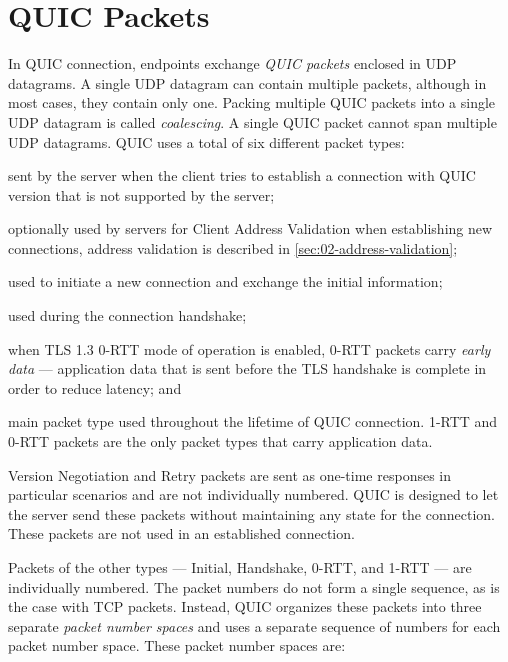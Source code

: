 \section{QUIC Packets}

In QUIC connection, endpoints exchange \textit{QUIC packets} enclosed in UDP datagrams. A single UDP
datagram can contain multiple packets, although in most cases, they contain only one. Packing
multiple QUIC packets into a single UDP datagram is called \textit{coalescing}. A single QUIC packet
cannot span multiple UDP datagrams. QUIC uses a total of six different packet types:

\begin{enumerate}

   sent by the server when the client tries to establish a connection
with QUIC version that is not supported by the server;

   optionally used by servers for Client Address Validation when establishing new
connections, address validation is described in \autoref{sec:02-address-validation};

   used to initiate a new connection and exchange the initial information;

   used during the connection handshake;

   when TLS 1.3 0-RTT mode of operation is enabled, 0-RTT packets carry \textit{early
data} --- application data that is sent before the TLS handshake is complete in order to reduce
latency; and

   main packet type used throughout the lifetime of QUIC connection. 1-RTT and 0-RTT
packets are the only packet types that carry application data.

\end{enumerate}

Version Negotiation and Retry packets are sent as one-time responses in particular scenarios and are
not individually numbered. QUIC is designed to let the server send these packets without maintaining
any state for the connection. These packets are not used in an established connection.

Packets of the other types --- Initial, Handshake, 0-RTT, and 1-RTT --- are individually numbered. The
packet numbers do not form a single sequence, as is the case with TCP packets. Instead, QUIC
organizes these packets into three separate \textit{packet number spaces} and uses a separate
sequence of numbers for each packet number space. These packet number spaces are:

